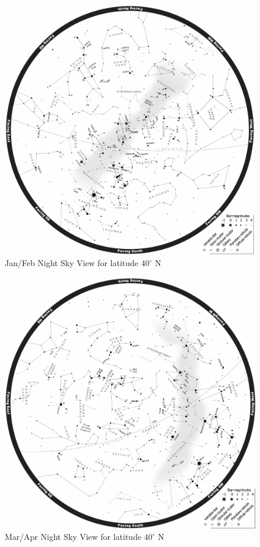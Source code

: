 \documentclass[a4paper,12pt]{extarticle}
\begin{document}
\begin{figure}[H]
    \centering
    \includegraphics[width=0.9 \linewidth]{jan-feb.png}
    \caption{Jan/Feb Night Sky View for latitude $40^\circ$ N}
\end{figure}
\clearpage
\begin{figure}
    \centering
    \includegraphics[width=0.9 \linewidth]{mar-apr.png}
    \caption{Mar/Apr Night Sky View for latitude $40^\circ$ N}
\end{figure}
\end{document}
